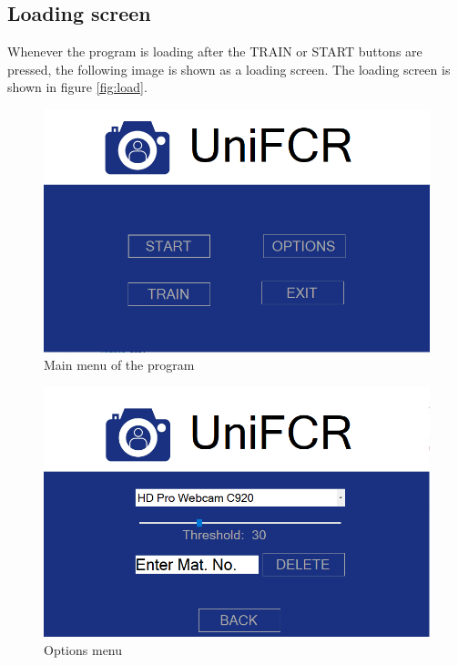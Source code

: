 \documentclass[12pt, a4paper]{article}
\begin{document}
\subsection{Loading screen}
Whenever the program is loading after the TRAIN or START buttons are pressed, the following image is shown as a loading screen. The loading screen is shown in figure \ref{fig:load}.
\begin{figure}[htb]
	\centering
		\includegraphics[width=1.0\columnwidth]{images/menu}
	\caption{Main menu of the program}
	\label{fig:menu}
\end{figure}
\begin{figure}[htb]
	\centering
		\includegraphics[width=1.0\columnwidth]{images/options}
	\caption{Options menu}
	\label{fig:options}
\end{figure}
\end{document}
